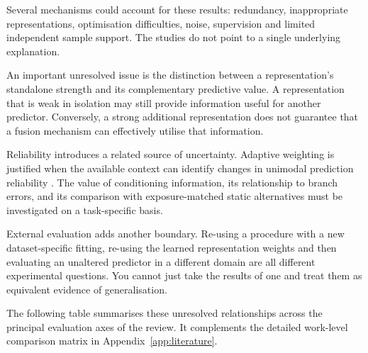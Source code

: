 Several mechanisms could account for these results: redundancy, inappropriate representations,
optimisation difficulties, noise, supervision and limited independent sample support. The studies do
not point to a single underlying explanation.

An important unresolved issue is the distinction between a representation's standalone strength and
its complementary predictive value. A representation that is weak in isolation may still provide
information useful for another predictor. Conversely, a strong additional representation does not
guarantee that a fusion mechanism can effectively utilise that information.

Reliability introduces a related source of uncertainty. Adaptive weighting is justified when the
available context can identify changes in unimodal prediction reliability \citep{Zhang2023QMF,P022}.
The value of conditioning information, its relationship to branch errors, and its comparison with
exposure-matched static alternatives must be investigated on a task-specific basis.

External evaluation adds another boundary. Re-using a procedure with a new dataset-specific fitting,
re-using the learned representation weights and then evaluating an unaltered predictor in a
different domain are all different experimental questions. You cannot just take the results of one
and treat them as equivalent evidence of generalisation.

The following table summarises these unresolved relationships across the principal evaluation axes
of the review. It complements the detailed work-level comparison matrix in
Appendix~\ref{app:literature}.

